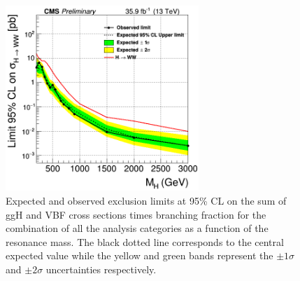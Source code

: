 \begin{figure}[htb]
\centering
\includegraphics[width=0.65\textwidth]{../Cap6/all}
\caption{Expected and observed exclusion limits at 95\% CL on the sum of ggH and VBF cross
sections times branching fraction for the combination of all the analysis categories as a function
of the resonance mass. The black dotted line corresponds to the central expected value while
the yellow and green bands represent the $\pm 1 \sigma$ and $\pm 2 \sigma$ uncertainties respectively.}
\label{lim_superC}
\end{figure}
